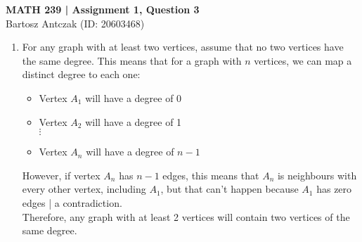 \documentclass{report}
\begin{document}
\noindent \textbf{MATH 239 | Assignment 1, Question 3}\\
Bartosz Antczak (ID: 20603468)
\onehalfspacing
\begin{enumerate}
\item For any graph with at least two vertices, assume that no two vertices have the same degree. This means that for a graph with $n$ vertices, we can map a distinct degree to each one:
\begin{itemize}
\item Vertex $A_1$ will have a degree of 0
\item Vertex $A_2$ will have a degree of 1\\
$\vdots$
\item Vertex $A_n$ will have a degree of $n-1$
\end{itemize}
However, if vertex $A_n$ has $n-1$ edges, this means that $A_n$ is neighbours with every other vertex, including $A_1$, but that can't happen because $A_1$ has zero edges | a contradiction.\\
Therefore, any graph with at least 2 vertices will contain two vertices of the same degree.
\end{enumerate}
\end{document}
